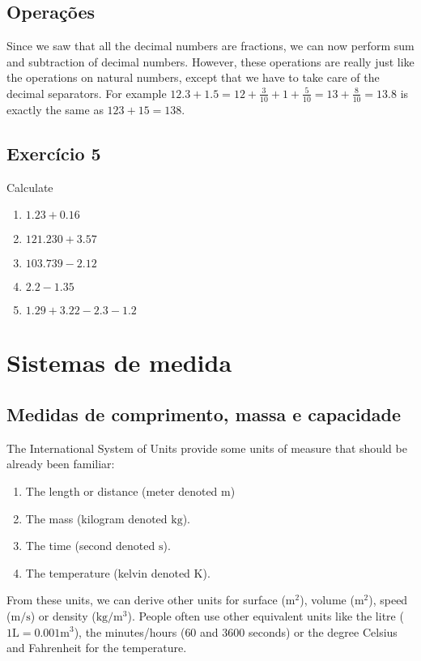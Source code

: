 \subsection*{Operações}

Since we saw that all the decimal numbers are fractions, we can now perform
sum and subtraction of decimal numbers. However, these operations are really
just like the operations on natural numbers, except that we have to take care
of the decimal separators. For example
$12.3+1.5 = 12+\frac{3}{10}+1+\frac{5}{10} = 13+\frac{8}{10} = 13.8$ is
exactly the same as $123+15=138$.

\subsection*{Exercício 5}

Calculate

\begin{enumerate}
\item $1.23+0.16$
\item $121.230+3.57$
\item $103.739-2.12$
\item $2.2-1.35$
\item $1.29+3.22-2.3-1.2$
\end{enumerate}

\section{Sistemas de medida}

\subsection*{Medidas de comprimento, massa e capacidade}

The International System of Units provide some units of measure that should
be already been familiar:

\begin{enumerate}
\item The length or distance (meter denoted $\text{m}$)
\item The mass (kilogram denoted $\text{kg}$).
\item The time (second denoted $\text{s}$).
\item The temperature (kelvin denoted $\text{K}$).
\end{enumerate}

From these units, we can derive other units for surface ($\text{m}^2$),
volume ($\text{m}^2$), speed ($\text{m}/\text{s}$) or density
($\text{kg}/\text{m}^3$). People often use other equivalent units like
the litre ($1\text{L}=0.001 \text{m}^3$), the minutes/hours ($60$ and $3600$
seconds) or the degree Celsius and Fahrenheit for the temperature.

